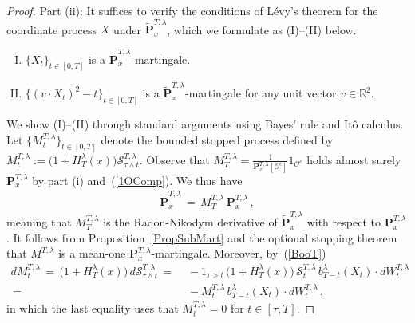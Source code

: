 \documentclass[10pt]{article}
\numberwithin{equation}{section}
\theoremstyle{definition}
\newcommand{\R}{{\mathbb R}}
\begin{document}
\begin{proof}
\noindent  Part (ii):   It suffices to verify the conditions of L\'evy's theorem for the coordinate process $X$ under $\mathbf{\widetilde{P}}_{x}^{T,\lambda}$, which we formulate as (I)--(II) below.  
\begin{enumerate}[(I)]

\item $\{X_t\}_{t\in [0,T]}$ is a  $\mathbf{\widetilde{P}}_{x}^{T,\lambda}$-martingale.

\item $\big\{ (v\cdot X_t)^2-t \big\}_{t\in [0,T]}$ is a $\mathbf{\widetilde{P}}_{x}^{T,\lambda}$-martingale  for any unit vector $v\in \R^2$.

\end{enumerate}
We show (I)--(II) through standard arguments using Bayes' rule and It\^o calculus. Let $\{M_{t}^{T,\lambda}\}_{t\in [0,T]}$ denote the bounded stopped process defined by  $M_{t}^{T,\lambda}:=\big( 
1+H_{T}^{\lambda }(x)   \big)\mathcal{S}_{\tau\wedge t}^{T,\lambda} $. 
Observe that   $M_{T }^{T,\lambda}  =\frac{1}{\mathbf{P}_{x }^{T,\lambda }[\mathcal{O}^c  ]  }1_{ \mathcal{O}^c} $ holds almost surely $\mathbf{P}_{x }^{T,\lambda }$ by part (i) and~(\ref{1OComp}). We thus  have
\begin{align*}
 \mathbf{\widetilde{P}}_{x }^{T,\lambda }\,=\,M_{T}^{T,\lambda}\,\mathbf{P}_{x  }^{T,\lambda} \,, \end{align*}
 meaning that $M_{T}^{T,\lambda}$ is the Radon-Nikodym derivative of $\mathbf{\widetilde{P}}_{x }^{T,\lambda }$ with respect to $\mathbf{P}_{x  }^{T,\lambda} $.  It follows from Proposition~\ref{PropSubMart} and the optional stopping theorem that $M^{T,\lambda}$ is a mean-one $\mathbf{P}_{x  }^{T,\lambda}$-martingale.  Moreover, by~(\ref{BooT})  
\begin{align}\label{Emmy}
dM_{t}^{T,\lambda}\,=\,\big( 
1+H_{T}^{\lambda }(x)   \big)\,d\mathcal{S}_{\tau\wedge t}^{T,\lambda} \,=\,&\,-1_{\tau > t  } \,\big( 
1+H_{T}^{\lambda }(x)   \big)\, \mathcal{S}_{t}^{T,\lambda}\,b_{T-t}^{\lambda}(X_t) \cdot dW_{t}^{T,\lambda}\nonumber  \\ \,=\,&\,-M_{t}^{T,\lambda}\, b_{T-t}^{\lambda}(X_t)\cdot dW_{t}^{T,\lambda} \,,
\end{align}
in which the last equality uses that $M_{t}^{T,\lambda}=0$ for $t\in [\tau,T]$. \vspace{.3cm}


\end{proof}
\end{document}
